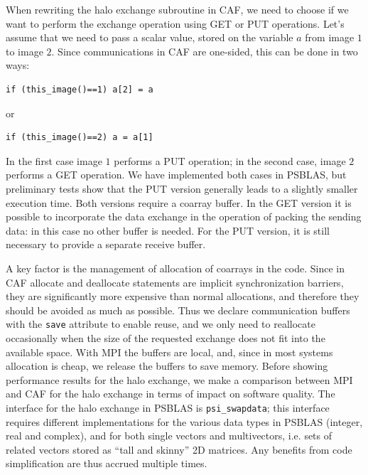 \documentclass{IOS-Book-Article}
\begin{document}
When rewriting the halo exchange subroutine in CAF, we need to choose
if we want to perform the exchange operation using GET or PUT
operations.  
Let's assume that we need to pass a scalar value, stored on the
variable $a$ from image $1$ to image $2$. Since communications in CAF
are one-sided, this can be done in two ways: 
\lstset{language=Fortran} 
{\small
\begin{lstlisting}
if (this_image()==1) a[2] = a
\end{lstlisting}}
or
{\small
\begin{lstlisting}
if (this_image()==2) a = a[1]
\end{lstlisting}}
In the first case image $1$ performs a PUT operation; in the second
case, image $2$ performs a GET operation. We have implemented both
cases in PSBLAS, but preliminary tests  show that the PUT version
generally leads to a slightly smaller execution time.
Both versions require a coarray buffer. In the GET version it is
possible to incorporate the data exchange in the operation of packing
the sending data: in this case no other buffer is needed. For the PUT
version, it is still necessary to provide a separate receive buffer.

A key factor is the management of  allocation of coarrays in the
code. Since in CAF allocate and deallocate statements are implicit
synchronization barriers, they are significantly more expensive than
normal allocations, and therefore  they should be
avoided as much as possible.  Thus we declare communication
buffers with the \verb|save| attribute to enable reuse, and we only
need to reallocate occasionally when the size of the requested
exchange does not fit into the available space. 
 With MPI the buffers are local, and, since in most systems allocation
 is cheap, we %
 release the buffers to save memory.
Before showing performance results for  the halo exchange, we 
make a comparison between MPI and CAF for the halo exchange in terms
of impact on software quality.  
The interface for the halo exchange in PSBLAS is \verb|psi_swapdata|;
this interface requires different implementations for the various data
types  in PSBLAS (integer, real and complex), and  for both single
vectors and multivectors, i.e. sets of related vectors stored as
``tall and skinny'' 2D matrices. Any benefits from code simplification
are thus accrued multiple times.
\end{document}
